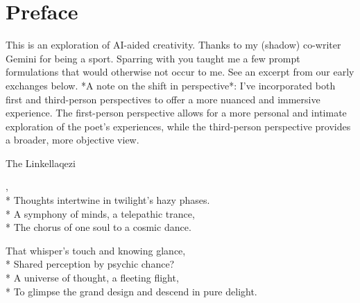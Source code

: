 \documentclass[12pt]{book}
\begin{document}
    \maketitle
    \makededication

    \frontmatter

    \maketoc

    \renewcommand*{\topname}{Poems} %
    \maketop

    \section{Preface}
    This is an exploration of AI-aided creativity.
    Thanks to my (shadow) co-writer Gemini for being a sport. Sparring with you taught me a few
    prompt formulations that would otherwise not occur to me. See an excerpt from our early exchanges below.
    *A note on the shift in perspective*: I've incorporated both first and third-person perspectives to offer a more
    nuanced and immersive experience. The first-person perspective allows for a more personal and intimate exploration
    of the poet's experiences, while the third-person perspective provides a broader, more objective view.

    \newpage
    \thispagestyle{empty}

    \mainmatter

    \begin{poem}{The Link}{ellaqezi}

        \settowidth{\versewidth}{To glimpse the grand design and descend in pure delight.}

        \begin{altverse}
            ,\\*
            Thoughts intertwine in twilight's hazy phases.\\*
            A symphony of minds, a telepathic trance,\\*
            The chorus of one soul to a cosmic dance.
        \end{altverse}

        \begin{altverse}
            That whisper's touch and knowing glance,\\*
            Shared perception by psychic chance?\\*
            A universe of thought, a fleeting flight,\\*
            To glimpse the grand design and descend in pure delight.
        \end{altverse}

    \end{poem}
\end{document}
